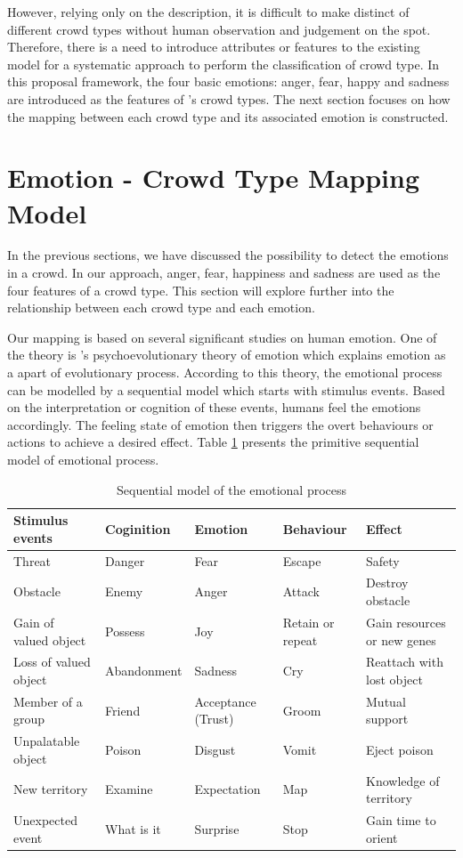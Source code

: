 However, relying only on the description, it is difficult to make distinct of different crowd types without human observation and judgement on the spot. Therefore, there is a need to introduce attributes or features to the existing model for a systematic approach to perform the classification of crowd type. In this proposal framework, the four basic emotions: anger, fear, happy and sadness are introduced as the features of \citet{Berlonghi1995}'s crowd types. The next section focuses on how the mapping between each crowd type and its associated emotion is constructed.

\section{Emotion - Crowd Type Mapping Model}
In the previous sections, we have discussed the possibility to detect the emotions in a crowd. In our approach, anger, fear, happiness and sadness are used as the four features of a crowd type. This section will explore further into the relationship between each crowd type and each emotion. 

Our mapping is based on several significant studies on human emotion. One of the theory is \citet{Plutchik1980}'s psychoevolutionary theory of emotion which explains emotion as a apart of evolutionary process. According to this theory, the emotional process can be modelled by a sequential model which starts with stimulus events. Based on the interpretation or cognition of these events, humans feel the emotions accordingly. The feeling state of emotion then triggers the overt behaviours or actions to achieve a desired effect. Table \ref{table:sequentialModelOfEmotion} presents the primitive sequential model of emotional process.

\begin{table}
\caption{Sequential model of the emotional process}
\label{table:sequentialModelOfEmotion}
\centering
\begin{tabular}{|p{2.5cm}|p{2.3cm}|p{2.3cm}|p{2.3cm}|p{3.5cm}|}
\hline
\textbf{Stimulus events} & \textbf{Coginition} & \textbf{Emotion} & \textbf{Behaviour} & \textbf{Effect} \\
\hline
Threat & Danger & Fear & Escape & Safety \\
\hline
Obstacle & Enemy & Anger & Attack & Destroy obstacle \\
\hline
Gain of valued object & Possess & Joy & Retain or repeat & Gain resources or new genes \\
\hline
Loss of valued object & Abandonment & Sadness & Cry & Reattach with lost object \\
\hline
Member of a group & Friend & Acceptance (Trust) & Groom & Mutual support \\
\hline
Unpalatable object & Poison & Disgust & Vomit & Eject poison \\
\hline
New territory & Examine & Expectation & Map & Knowledge of territory \\
\hline
Unexpected event & What is it & Surprise & Stop & Gain time to orient \\
\hline
\end{tabular}
\end{table}

